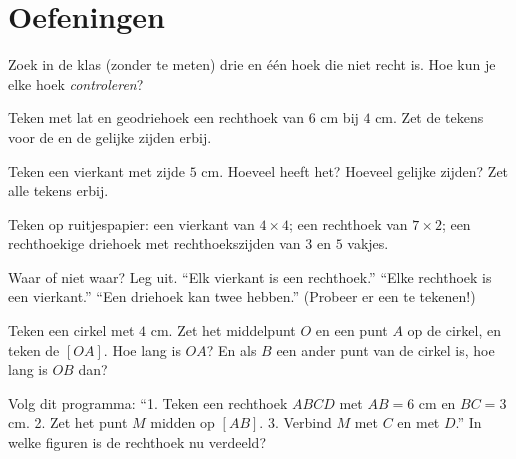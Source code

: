 \section{Oefeningen}

\begin{exercise}[$\star$]\label{exo:g3:shapes:1}
Zoek in de klas (zonder te meten) drie  en één hoek die niet
recht is. Hoe kun je elke hoek \emph{controleren}?
\end{exercise}

\begin{exercise}[$\star$]\label{exo:g3:shapes:2}
Teken met lat en geodriehoek een rechthoek van $6$ cm bij $4$ cm. Zet de
tekens voor de  en de gelijke zijden erbij.
\end{exercise}

\begin{exercise}[$\star$]\label{exo:g3:shapes:3}
Teken een vierkant met zijde $5$ cm. Hoeveel  heeft het?
Hoeveel gelijke zijden? Zet alle tekens erbij.
\end{exercise}

\begin{exercise}[$\star$]\label{exo:g3:shapes:4}
Teken op ruitjespapier: een vierkant van $4 \times 4$; een rechthoek van
$7 \times 2$; een rechthoekige driehoek met rechthoekszijden van $3$ en
$5$ vakjes.
\end{exercise}

\begin{exercise}[$\star$]\label{exo:g3:shapes:5}
Waar of niet waar? Leg uit.
``Elk vierkant is een rechthoek.'' \quad
``Elke rechthoek is een vierkant.'' \quad
``Een driehoek kan twee  hebben.'' (Probeer er een te
tekenen!)
\end{exercise}

\begin{exercise}[$\star$]\label{exo:g3:shapes:6}
Teken een cirkel met  $4$ cm. Zet het middelpunt $O$ en een punt
$A$ op de cirkel, en teken de  $[OA]$. Hoe lang is $OA$? En als $B$
een ander punt van de cirkel is, hoe lang is $OB$ dan?
\end{exercise}

\begin{exercise}[$\star$]\label{exo:g3:shapes:7}
Volg dit programma: ``1. Teken een rechthoek $ABCD$ met $AB = 6$ cm en
$BC = 3$ cm. 2. Zet het punt $M$ midden op $[AB]$. 3. Verbind $M$ met $C$
en met $D$.'' In welke figuren is de rechthoek nu verdeeld?
\end{exercise}

